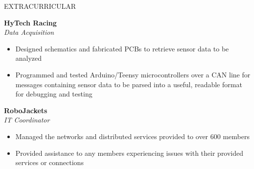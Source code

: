 \documentclass{resume} %
\begin{document}
\vspace{-0.8em}
\begin{rSection}{EXTRACURRICULAR}
\vspace{-1.25em}
\item \textbf{HyTech Racing}\\
\textit{Data Acquisition}
\vspace{-0.5em}
 \begin{itemize}
    \itemsep -5pt {} 
    \item Designed schematics and fabricated PCBs to retrieve sensor data to be analyzed
    \item Programmed and tested Arduino/Teensy microcontrollers over a CAN line for
    messages containing sensor data to be parsed into a useful, readable format for debugging and testing
 \end{itemize}
\vspace{-0.5em}
\item \textbf{RoboJackets}\\
\textit{IT Coordinator}
\vspace{-0.5em}
 \begin{itemize}
    \itemsep -5pt {} 
    \item Managed the networks and distributed services provided to over 600 members
    \item Provided assistance to any members experiencing issues with their provided services or connections
 \end{itemize}
\end{rSection}
\end{document}
